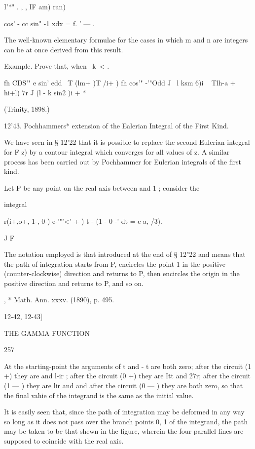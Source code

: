 I'*" . , , IF am) ran) 

cos' -  cc sin" -1 xdx =   f. ' —   . 

The well-known elementary formulae for the cases in which m and n are 
integers can be at once derived from this result. 

Example. Prove that, when \ k\ < .\, 

fh  CDS'" e sin' edd \  T (lm+ )T   /i+ ) fh  cos'" -'"Odd 
J \ l ksm 6)i ~ Tlh-a + hi+l) 7r J (l - k sin2  )i +  * 

(Trinity, 1898.) 

12'43. Pochhammers* extension of the Ealerian Integral of the First 
Kind. 

We have seen in § 12'22 that it is possible to replace the second Eulerian 
integral for F  z) by a contour integral which converges for all values of z. 
A similar process has been carried out by Pochhammer for Eulerian integrals 
of the first kind. 

Let P be any point on the real axis between and 1 ; consider the 

integral 

r(i+,o+, 1-, 0-) 
e-'"'<' + ) t -  (1 - 0 -' dt = e  a, /3). 

J F 

The notation employed is that introduced at the end of § 12"22 and 
means that the path of integration starts from P, encircles the point 1 in the 
positive (counter-clockwise) direction and returns to P, then encircles the 
origin in the positive direction and returns to P, and so on. 

, * Math. Ann. xxxv. (1890), p. 495. 



12-42, 12-43] 



THE GAMMA FUNCTION 



257 



At the starting-point the arguments of t and  - t are both zero; after 
the circuit (1 +) they are and l-ir ; after the circuit (0 +) they are Itt and 
27r; after the circuit (1 — ) they are lir and and after the circuit (0 — ) they 
are both zero, so that the final vahie of the integrand is the same as the 
initial value. 

It is easily seen that, since the path of integration may be deformed in 
any way so long as it does not pass over the branch points 0, 1 of the 
integrand, the path may be taken to be that shewn in the figure, wherein 
the four parallel lines are supposed to coincide with the real axis. 




